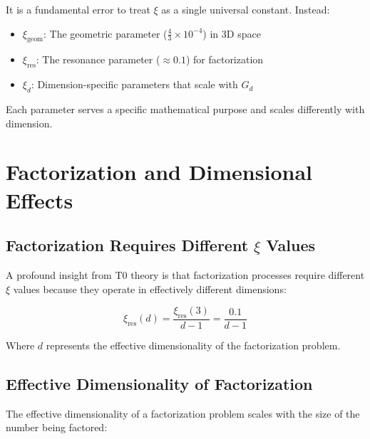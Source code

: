 \documentclass[12pt,a4paper]{article}
\newcommand{\xipar}{\ensuremath{\xi}}
\newcommand{\mytimes}{\ensuremath{\times}}
\begin{document}
	\begin{tcolorbox}[colback=red!5!white,colframe=red!75!black,title=Critical Understanding: Multiple $\xi$ Parameters]
		It is a fundamental error to treat $\xipar$ as a single universal constant. Instead:
		
		\begin{itemize}
			\item $\xipar_{\text{geom}}$: The geometric parameter ($\frac{4}{3} \mytimes 10^{-4}$) in 3D space
			\item $\xipar_{\text{res}}$: The resonance parameter ($\approx 0.1$) for factorization
			\item $\xipar_d$: Dimension-specific parameters that scale with $G_d$
		\end{itemize}
		
		Each parameter serves a specific mathematical purpose and scales differently with dimension.
	\end{tcolorbox}
	
	\section{Factorization and Dimensional Effects}
	\label{sec:factorization_dimensional}
	
	\subsection{Factorization Requires Different $\xi$ Values}
	\label{subsec:factorization_xi}
	
	A profound insight from T0 theory is that factorization processes require different $\xipar$ values because they operate in effectively different dimensions:
	
	\begin{equation}
		\xipar_{\text{res}}(d) = \frac{\xipar_{\text{res}}(3)}{d-1} = \frac{0.1}{d-1}
	\end{equation}
	
	Where $d$ represents the effective dimensionality of the factorization problem.
	
	\subsection{Effective Dimensionality of Factorization}
	\label{subsec:effective_dimensionality}
	
	The effective dimensionality of a factorization problem scales with the size of the number being factored:
	
\end{document}
